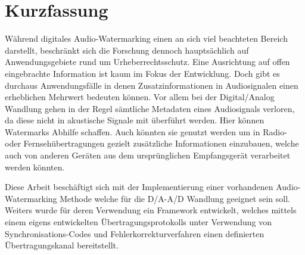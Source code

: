 \chapter*{Kurzfassung}

Während digitales Audio-Watermarking einen an sich viel beachteten Bereich darstellt, beschränkt sich die Forschung dennoch hauptsächlich auf Anwendungsgebiete rund um Urheberrechtsschutz. Eine Ausrichtung auf offen eingebrachte Information ist kaum im Fokus der Entwicklung. Doch gibt es durchaus Anwendungsfälle in denen Zusatzinformationen in Audiosignalen einen erheblichen Mehrwert bedeuten können. Vor allem bei der Digital/Analog Wandlung gehen in der Regel sämtliche Metadaten eines Audiosignals verloren, da diese nicht in akustische Signale mit überführt werden.
Hier können Watermarks Abhilfe schaffen. Auch könnten sie genutzt werden um in Radio- oder Fernsehübertragungen gezielt zusätzliche Informationen einzubauen, welche auch von anderen Geräten aus dem ursprünglichen Empfangsgerät verarbeitet werden könnten.

Diese Arbeit beschäftigt sich mit der Implementierung einer vorhandenen Audio-Watermarking Methode welche für die D/A-A/D Wandlung geeignet sein soll. Weiters wurde für deren Verwendung ein Framework entwickelt, welches mittels einem eigens entwickelten Übertragungsprotokolls unter Verwendung von Synchronisations-Codes und Fehlerkorrekturverfahren einen definierten Übertragungskanal bereitstellt. 